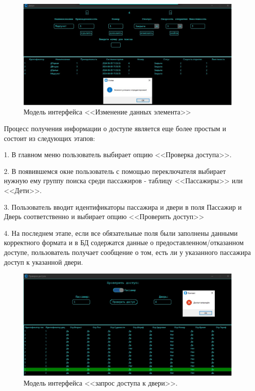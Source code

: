 \begin{figure} [ht]
	\centering
	\includegraphics[width=1\linewidth]{images/Example1}
	\caption{Модель интерфейса <<Изменение данных элемента>>}
	\label{fig:example1}
\end{figure}
Процесс получения информации о доступе является еще более простым и состоит из следующих этапов:

1. В главном меню пользователь выбирает опцию <<Проверка доступа>>.

2. В появившемся окне пользователь с помощью переключателя выбирает нужную ему группу поиска среди пассажиров - таблицу <<Пассажиры>> или <<Дети>>.

3. Пользователь вводит идентификаторы пассажира и двери в поля \textquotedbl Пассажир \textquotedbl и \textquotedbl Дверь \textquotedbl соответственно и выбирает опцию <<Проверить доступ>>

4. На последнем этапе, если все обязательные поля были заполнены данными корректного формата и в БД содержатся данные о предоставленном/отказанном доступе, пользователь получает сообщение о том, есть ли у указанного пассажира доступ к указанной двери.

\begin{figure} [ht]
	\centering
	\includegraphics[width=1\linewidth]{images/Example3}
	\caption{Модель интерфейса <<запрос доступа к двери>>.}
	\label{fig:example3}
\end{figure}


